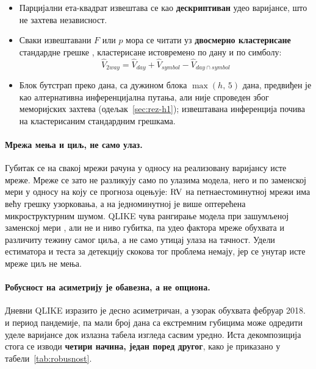\begin{itemize}
\item Парцијални ета-квадрат извештава се као \textbf{дескриптиван} удео варијансе,
      што не захтева независност.
\item Сваки извештавани $F$ или $p$ мора се читати уз \textbf{двосмерно кластерисане}
      стандардне грешке \parencite{cgm2011}, кластерисане истовремено по дану и по
      симболу:
      \begin{equation}
      \hat{V}_{2way} = \hat{V}_{day} + \hat{V}_{symbol} - \hat{V}_{day \cap symbol}
      \end{equation}
\item Блок бутстрап преко дана, са дужином блока $\max(h,\,5)$ дана, предвиђен је као
      алтернативна инференцијална путања, али није спроведен због меморијских захтева
      (одељак~\ref{sec:rez-h1}); извештавана инференција почива на кластерисаним
      стандардним грешкама.
\end{itemize}

\paragraph{Мрежа мења и циљ, не само улаз.}
Губитак се на свакој мрежи рачуна у односу на реализовану варијансу исте мреже. Мреже
се зато не разликују само по улазима модела, него и по заменској мери у односу на коју се
прогноза оцењује: $\mathrm{RV}$ на петнаестоминутној мрежи има већу грешку узорковања, а на
једноминутној је више оптерећена микроструктурним шумом. QLIKE чува рангирање модела
при зашумљеној заменској мери \parencite{patton2011}, али не и ниво губитка, па удео фактора
мреже обухвата и различиту тежину самог циља, а не само утицај улаза на тачност. Удели
естиматора и теста за детекцију скокова тог проблема немају, јер се унутар исте мреже
циљ не мења.

\paragraph{Робусност на асиметрију је обавезна, а не опциона.}
Дневни QLIKE изразито је десно асиметричан, а узорак обухвата фебруар 2018. и период
пандемије, па мали број дана са екстремним губицима може одредити уделе варијансе док
излазна табела изгледа
сасвим уредно. Иста декомпозиција стога се изводи \textbf{четири начина, један поред
другог}, како је приказано у табели~\ref{tab:robusnost}.

